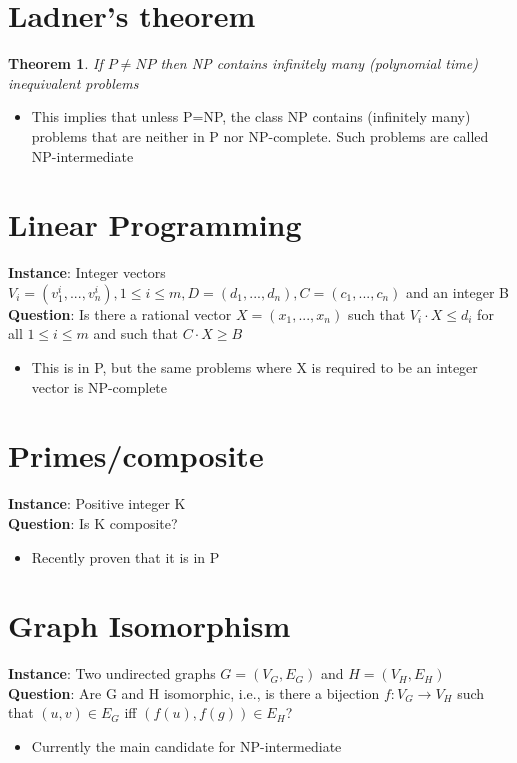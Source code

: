 \documentclass{article}[18pt]
\newtheorem{theorem}{Theorem}
\begin{document}
\section{Ladner's theorem}
\begin{theorem}
If $P\neq NP$ then NP contains infinitely many (polynomial time) inequivalent problems
\end{theorem}
\begin{itemize}
	\item This implies that unless P=NP, the class NP contains (infinitely many) problems that are neither in P nor NP-complete. Such problems are called NP-intermediate
\end{itemize}
\section{Linear Programming}
\begin{problem}
\textbf{Instance}: Integer vectors $V_i=(v_1^i,...,v_n^i), 1\leqslant i\leqslant m, D=(d_1,...,d_n), C=(c_1,...,c_n)$ and an integer B\\
\textbf{Question}: Is there a rational vector $X=(x_1,...,x_n)$ such that $V_i\cdot X\leqslant d_i$ for all $1\leqslant i\leqslant m$ and such that $C\cdot X\geqslant B$
\end{problem}
\begin{itemize}
	\item This is in P, but the same problems where X is required to be an integer vector is NP-complete
\end{itemize}
\section{Primes/composite}
\begin{problem}[Composite]
\textbf{Instance}: Positive integer K\\
\textbf{Question}: Is K composite?
\end{problem}
\begin{itemize}
	\item Recently proven that it is in P
\end{itemize}
\section{Graph Isomorphism}
\begin{problem}
\textbf{Instance}: Two undirected graphs $G=(V_G,E_G)$ and $H=(V_H,E_H)$\\
\textbf{Question}: Are G and H isomorphic, i.e., is there a bijection $f:V_G\rightarrow V_H$ such that $(u,v)\in E_G$ iff $(f(u),f(g))\in E_H$?
\end{problem}
\begin{itemize}
	\item Currently the main candidate for NP-intermediate
\end{itemize}
\end{document}
